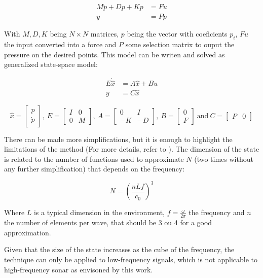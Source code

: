 \begin{align*}
M\ddot{p} + D\dot{p} + Kp &= Fu \\
y &= Pp
\end{align*}

With \(M,D,K\) being \(N \times N \) matrices, $p$ being the vector with
coeficients $p_i$, $Fu$ the input converted into a force and $P$ some selection
matrix to ouput the pressure on the desired points. This model can be writen and
solved as generalized state-space model:

\begin{align*}
E\dot{\hat{x}} &= A\hat{x} + Bu \\
y &= C\hat{x}
\end{align*}

\[
\hat{x} =
  \begin{bmatrix}
    p \\
    \dot{p}
  \end{bmatrix},~
E =
  \begin{bmatrix}
    I & 0 \\
    0 & M
  \end{bmatrix},~
A =
  \begin{bmatrix}
    0 & I \\
    -K & -D
  \end{bmatrix},~
B =
  \begin{bmatrix}
    0 \\
    F
  \end{bmatrix}
  ~
  \text{and}
  ~
C =
  \begin{bmatrix}
    P & 0 
  \end{bmatrix}
\]
 
 There can be made more simplifications, but it is enough to highlight the
 limitations of the method (For more details, refer to
 \citet{deines2006comparative}). The dimension of the state is related to
 the number of functions used to approximate $N$ (two times without any further
 simplification) that depends on the frequency:
 
 \[N = \left(\frac{nLf}{c_0}\right)^3 \]
 
 Where $L$ is a typical dimension in the environment, $f = \frac{\omega}{2\pi}$
 the frequency and $n$ the number of elements per wave, that should be 3 ou 4
 for a good approximation\cite{deines2006comparative}.
 
 Given that the size of the state increases as the cube of the frequency, the
 technique can only be applied to low-frequency signals, which is not applicable
 to high-frequency sonar as envisoned by this work. 

